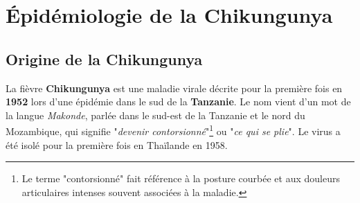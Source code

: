\chapter{Épidémiologie de la Chikungunya}

\section{Origine de la Chikungunya}
La fièvre \textbf{Chikungunya} est une maladie virale décrite pour la première fois en \textbf{1952} lors d'une épidémie dans le sud de la \textbf{Tanzanie}. Le nom vient d'un mot de la langue \textit{Makonde}, parlée dans le sud-est de la Tanzanie et le nord du Mozambique, qui signifie "\textit{devenir contorsionné}"\footnote{Le terme "contorsionné" fait référence à la posture courbée et aux douleurs articulaires intenses souvent associées à la maladie.} ou "\textit{ce qui se plie}". Le virus a été isolé pour la première fois en Thaïlande en 1958.\cite{origin}

